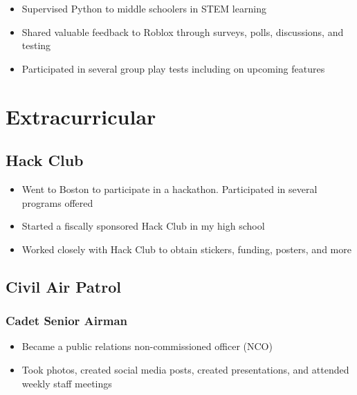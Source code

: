 \documentclass{my_cv}
\begin{document}
\begin{itemize}
    \item Supervised Python to middle schoolers in STEM learning
\end{itemize}

\begin{itemize}
    \item Shared valuable feedback to Roblox through surveys, polls, discussions, and testing
    \item Participated in several group play tests including on upcoming features
\end{itemize}


\section{Extracurricular}

\subsection{Hack Club}
\begin{itemize}
    \item Went to Boston to participate in a hackathon. Participated in several programs offered
    \item Started a fiscally sponsored Hack Club in my high school
    \item Worked closely with Hack Club to obtain stickers, funding, posters, and more
\end{itemize}

\subsection{Civil Air Patrol}
\subsubsection{Cadet Senior Airman}
\begin{itemize}
    \item Became a public relations non-commissioned officer (NCO)
    \item Took photos, created social media posts, created presentations, and attended weekly staff meetings
\end{itemize}
\end{document}
